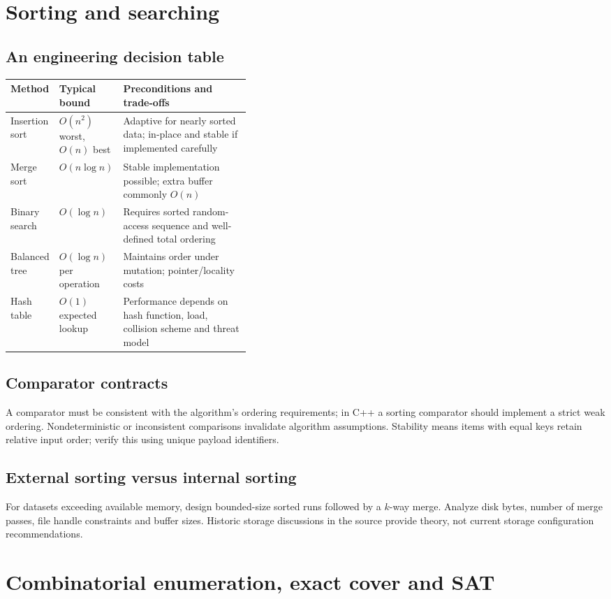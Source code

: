 \documentclass[11pt,letterpaper]{article}
\begin{document}
\section{Sorting and searching}
\subsection{An engineering decision table}
\begin{tabularx}{\linewidth}{@{}p{0.18\linewidth}p{0.22\linewidth}X@{}}\toprule
Method & Typical bound & Preconditions and trade-offs\\\midrule
Insertion sort & $O(n^2)$ worst, $O(n)$ best & Adaptive for nearly sorted data; in-place and stable if implemented carefully\\
Merge sort & $O(n\log n)$ & Stable implementation possible; extra buffer commonly $O(n)$\\
Binary search & $O(\log n)$ & Requires sorted random-access sequence and well-defined total ordering\\
Balanced tree & $O(\log n)$ per operation & Maintains order under mutation; pointer/locality costs\\
Hash table & $O(1)$ expected lookup & Performance depends on hash function, load, collision scheme and threat model\\
\bottomrule\end{tabularx}
\subsection{Comparator contracts}
A comparator must be consistent with the algorithm's ordering requirements; in C++ a sorting comparator should implement a strict weak ordering. Nondeterministic or inconsistent comparisons invalidate algorithm assumptions. Stability means items with equal keys retain relative input order; verify this using unique payload identifiers.
\subsection{External sorting versus internal sorting}
For datasets exceeding available memory, design bounded-size sorted runs followed by a $k$-way merge. Analyze disk bytes, number of merge passes, file handle constraints and buffer sizes. Historic storage discussions in the source provide theory, not current storage configuration recommendations.
\section{Combinatorial enumeration, exact cover and SAT}
\end{document}
